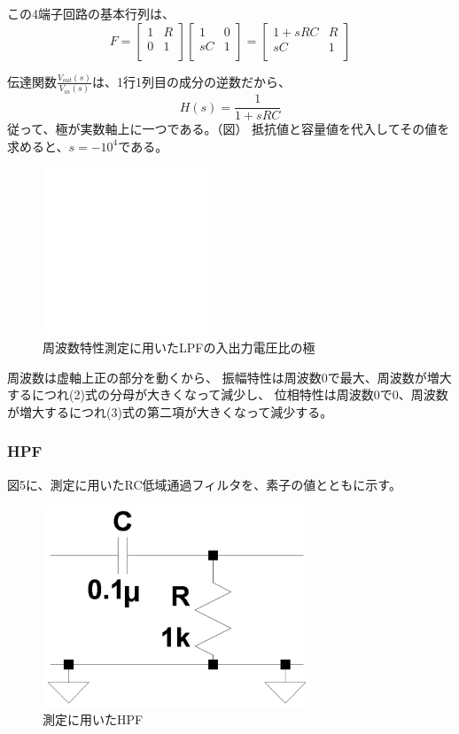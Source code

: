 \documentclass[10pt,a4j,dvipdfmx]{jsarticle}
\begin{document}
この4端子回路の基本行列は、
\begin{equation}
F =
\left[
\begin{array}{rr}
1 & R \\
0 & 1 \\
\end{array}
\right]
\left[
\begin{array}{rr}
1 & 0 \\
sC & 1 \\
\end{array}
\right]
=
\left[
\begin{array}{rr}
1+sRC & R \\
sC & 1 \\
\end{array}
\right]
\end{equation}

伝達関数$\frac{V_{out}\left(s\right)}{V_{in}\left(s\right)}$は、1行1列目の成分の逆数だから、
\begin{equation}
H\left(s\right) = \frac{1}{1+sRC}
\end{equation}
従って、極が実数軸上に一つである。（図）
抵抗値と容量値を代入してその値を求めると、$s = -10^4$である。
\begin{figure}[H]
  \centering
  \includegraphics[width=5cm]{token.png}
  \caption{周波数特性測定に用いたLPFの入出力電圧比の極}
\end{figure}

周波数は虚軸上正の部分を動くから、
振幅特性は周波数0で最大、周波数が増大するにつれ(2)式の分母が大きくなって減少し、
位相特性は周波数0で0、周波数が増大するにつれ(3)式の第二項が大きくなって減少する。

\subsubsection{HPF}
図5に、測定に用いたRC低域通過フィルタを、素子の値とともに示す。
\begin{figure}[H]
  \centering
  \includegraphics[width=8cm]{HPF.pdf}
  \caption{測定に用いたHPF}
\end{figure}
\end{document}
